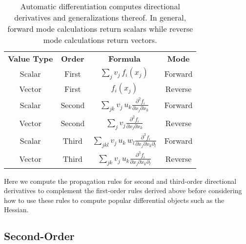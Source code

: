\documentclass[11pt]{article}
\begin{document}
\begin{table*}[t!]
	\centering
	\renewcommand{\arraystretch}{2}
	\begin{tabular}{cccc}
	\rowcolor[gray]{0.9} \textbf{Value Type} & \textbf{Order} 
	& \textbf{Formula} & \textbf{Mode} 
	\\
	Scalar & First & 
	$ \displaystyle \sum_{j} v_{j} \, f_{i} \! \left( x_{j} \right)$ & Forward
	\\
	\rowcolor[gray]{0.9}
	Vector & First & 
	$ \displaystyle  f_{i} \! \left( x_{j} \right)$ & Reverse
	\\
	Scalar & Second & 
	$ \displaystyle \sum_{jk} v_{j} \, u_{k} \frac{ \partial^{2} f_{i} }{ \partial x_{j} \partial x_{k} }$ 
	& Forward
	\\
	\rowcolor[gray]{0.9}
	Vector & Second & 
	$ \displaystyle \sum_{j} v_{j} \frac{ \partial^{2} f_{i} }{ \partial x_{j} \partial x_{k} }$  
	& Reverse
	\\
	Scalar & Third & 
	$ \displaystyle \sum_{jkl} v_{j} \, u_{k} \, w_{l} 
	\frac{ \partial^{3} f_{i} }{ \partial x_{j} \partial x_{k} \partial_{l}}$  
	& Forward
	\\
	\rowcolor[gray]{0.9}
	Vector & Third & 
	$\displaystyle \sum_{jk} v_{j} \, u_{k} \frac{ \partial^{3} f_{i} }{ \partial x_{j} \partial x_{k} \partial_{l}}$
	& Reverse
	\\
	\end{tabular}
	\caption{Automatic differentiation computes directional derivatives and
	generalizations thereof.  In general, forward mode calculations return
	scalars while reverse mode calculations return vectors.
	\label{tab:directDerivs}}
\end{table*}

Here we compute the propagation rules for second and third-order directional 
derivatives to complement the first-order rules derived above before considering 
how to use these rules to compute popular differential objects such as the Hessian.

\subsection*{Second-Order}
\end{document}

